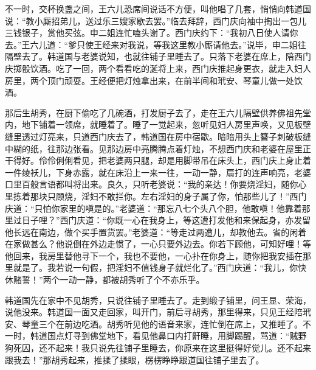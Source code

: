 不一时，交杯换盏之间，王六儿恐席间说话不方便，叫他唱了几套，悄悄向韩道国说：“教小厮招弟儿，送过乐三嫂家歇去罢。”临去拜辞，西门庆向袖中掏出一包儿三钱银子，赏他买弦。申二姐连忙嗑头谢了。西门庆约下：“我初八日使人请你去。”王六儿道：“爹只使王经来对我说，等我这里教小厮请他去。”说毕，申二姐往隔壁去了。韩道国与老婆说知，也就往铺子里睡去了。只落下老婆在席上，陪西门庆掷骰饮酒。吃了一回，两个看看吃的涎将上来，西门庆推起身更衣，就走入妇人房里，两个顶门顽耍。王经便把灯烛拿出来，在前半间和玳安、琴童儿做一处饮酒。

那后生胡秀，在厨下偷吃了几碗酒，打发厨子去了，走在王六儿隔壁供养佛祖先堂内，地下铺着一领席，就睡着了。睡了一觉起来，忽听见妇人房里声唤，又见板壁缝里透过灯亮来，只道西门庆去了，韩道国在房中宿歇。暗暗用头上簪子刺破板缝中糊的纸，往那边张看。见那边房中亮腾腾点着灯烛，不想西门庆和老婆在屋里正干得好。伶伶俐俐看见，把老婆两只腿，却是用脚带吊在床头上，西门庆上身止着一件绫袄儿，下身赤露，就在床沿上一来一往，一动一静，扇打的连声响亮，老婆口里百般言语都叫将出来。良久，只听老婆说：“我的亲达！你要烧淫妇，随你心里拣着那块只顾烧，淫妇不敢拦你。左右淫妇的身子属了你，怕那些儿了！”西门庆道：“只怕你家里的嗔是的。”老婆道：“那忘八七个头八个胆，他敢嗔！他靠着那里过日子哩？”西门庆道：“你既一心在我身上，等这遭打发他和来保起身，亦发留他长远在南边，做个买手置货罢。”老婆道：“等走过两遭儿，却教他去。省的闲着在家做甚么？他说倒在外边走惯了，一心只要外边去。你若下顾他，可知好哩！等他回来，我房里替他寻下一个，我也不要他，一心扑在你身上，随你把我安插在那里就是了。我若说一句假，把淫妇不值钱身子就烂化了。”西门庆道：“我儿，你快休赌誓！”两个一动一静，都被胡秀听了个不亦乐乎。

韩道国先在家中不见胡秀，只说往铺子里睡去了。走到缎子铺里，问王显、荣海，说他没来。韩道国一面又走回家，叫开门，前后寻胡秀，那里得来，只见王经陪玳安、琴童三个在前边吃酒。胡秀听见他的语音来家，连忙倒在席上，又推睡了。不一时，韩道国点灯寻到佛堂地下，看见他鼻口内打鼾睡，用脚踢醒，骂道：“贼野狗死囚，还不起来！我只说先往铺子里睡去，你原来在这里挺得好觉儿。还不起来跟我去！”那胡秀起来，推揉了揉眼，楞楞睁睁跟道国往铺子里去了。

